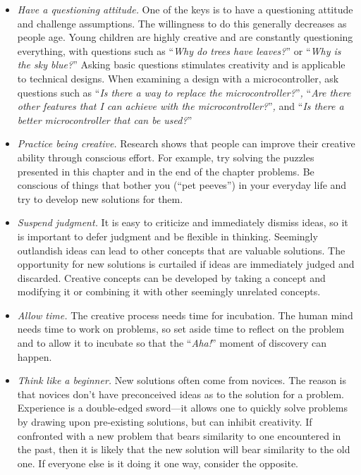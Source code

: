 \begin{itemize}
\item
  \emph{Have a questioning attitude.} One of the keys is to have a
  questioning attitude and chal­lenge assumptions. The willingness to do
  this generally decreases as people age. Young children are highly
  creative and are constantly questioning everything, with questions
  such as ``\emph{Why do trees have leaves?}'' or ``\emph{Why is the sky
  blue?}'' Asking basic questions stimulates creativity and is
  applicable to technical designs. When examin­ing a design with a
  microcontroller, ask questions such as ``\emph{Is there a way to
  replace the microcontroller?}''\emph{,} ``\emph{Are there other
  features that I can achieve with the microcontroller?}''\emph{,} and
  ``\emph{Is there a better microcontroller that can be used?}''
\item
  \emph{Practice being creative.} Research shows that people can improve
  their creative ability through conscious effort. For example, try
  solving the puzzles presented in this chapter and in the end of the
  chapter problems. Be conscious of things that bother you (``pet
  peeves'') in your everyday life and try to develop new solutions for
  them.
\item
  \emph{Suspend judgment.} It is easy to criticize and immediately
  dismiss ideas, so it is impor­tant to defer judgment and be flexible in
  thinking. Seemingly outlandish ideas can lead to other concepts that
  are valuable solutions. The opportunity for new solutions is curtailed
  if ideas are immediately judged and discarded. Creative concepts can
  be developed by taking a concept and modifying it or combining it with
  other seemingly unrelated concepts.
\item
  \emph{Allow time.} The creative process needs time for incubation. The
  human mind needs time to work on problems, so set aside time to
  reflect on the problem and to allow it to incubate so that the
  ``\emph{Aha!}'' moment of discovery can happen.
\item
  \emph{Think like a beginner.} New solutions often come from novices.
  The reason is that nov­ices don't have preconceived ideas as to the
  solution for a problem. Experience is a double-edged sword---it allows
  one to quickly solve problems by drawing upon pre-existing solutions,
  but can inhibit creativity. If confronted with a new problem that
  bears similarity to one encountered in the past, then it is likely
  that the new solution will bear similarity to the old one. If everyone
  else is it doing it one way, consider the opposite.
\end{itemize}

